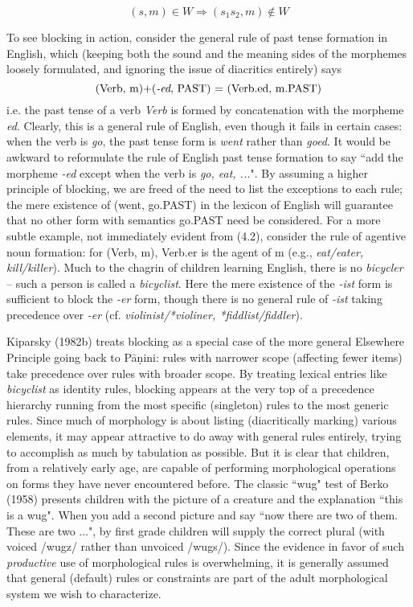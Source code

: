 \begin{equation}
(s,m) \in W \Rightarrow (s_1s_2,m) \not\in W
\end{equation} 

To see blocking in action, consider the general rule of past tense formation
in English, which (keeping both the sound and the meaning sides of the
morphemes loosely formulated, and ignoring the issue of diacritics entirely)
says $$\mbox{(Verb, m)+({\it -ed}, PAST) = (Verb.ed, m.PAST)}$$ i.e.  the past
tense of a verb {\it Verb} is formed by concatenation with the morpheme {\it
ed}.  Clearly, this is a general rule of English, even though it fails in
certain cases: when the verb is {\it go}, the past tense form is {\it went}
rather than {\it *goed}. It would be awkward to reformulate the rule of
English past tense formation to say ``add the morpheme {\it -ed} except when
the verb is {\it go, eat, ...}". By assuming a higher principle of blocking,
we are freed of the need to list the exceptions to each rule; the mere
existence of (went, go.PAST) in the lexicon of English will guarantee that no
other form with semantics go.PAST need be considered.  For a more subtle
example, not immediately evident from (4.2), consider the rule of agentive
noun formation: for (Verb, m), Verb.er is the agent of m (e.g., {\it eat/eater,
kill/killer}).  Much to the chagrin of children learning English, there is no
{\it *bicycler} -- such a person is called a {\it bicyclist}. Here the mere
existence of the {\it -ist} form is sufficient to block the {\it -er} form,
though there is no general rule of {\it -ist} taking precedence over {\it
-er} (cf. {\it violinist/*violiner, *fiddlist/fiddler}). 

Kiparsky (1982b) treats blocking as a special case of the more general
Elsewhere Principle going back to P\={a}\d{n}ini: rules with narrower scope
(affecting fewer items) take precedence over rules with broader scope.
 By treating lexical entries like {\it bicyclist} as
identity rules, blocking appears at the very top of a
precedence hierarchy running from the most specific (singleton) rules to the
most generic rules. Since much of morphology is about listing (diacritically
marking) various elements, it may appear attractive to do away with general
rules entirely, trying to accomplish as much by tabulation as possible. But it
is clear that children, from a relatively early age, are capable of performing
morphological operations on forms they have never encountered before. The
classic ``wug" test of Berko (1958) presents children with the picture of a
creature and the explanation ``this is a wug". When you add a second picture
and say ``now there are two of them. These are two ...", by first grade
children will supply the correct plural (with voiced /wugz/ rather than
unvoiced /wugs/). Since the evidence in favor of such {\it productive} use of
morphological rules is overwhelming, it is generally assumed that general
(default) rules or constraints are part of the adult morphological system we
wish to characterize.\nocite{Berko:1958}

